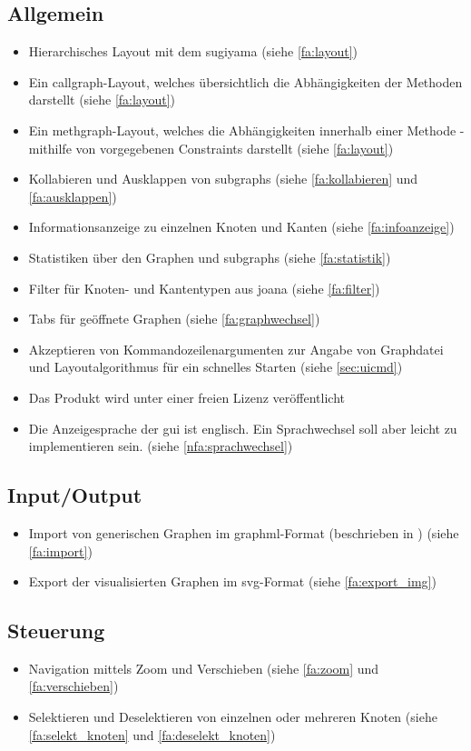 \subsection{Allgemein}
  \begin{itemize}
    \item Hierarchisches Layout mit dem \gls{sugiyama} (siehe \ref{fa:layout})
    \item Ein \gls{callgraph}-Layout, welches übersichtlich die Abhängigkeiten der Methoden darstellt (siehe \ref{fa:layout})
    \item Ein \gls{methgraph}-Layout, welches die Abhängigkeiten innerhalb einer Methode - mithilfe von vorgegebenen Constraints darstellt (siehe \ref{fa:layout})
    \item Kollabieren und Ausklappen von \glspl{subgraph} (siehe \ref{fa:kollabieren} und \ref{fa:ausklappen})
    \item Informationsanzeige zu einzelnen Knoten und Kanten (siehe \ref{fa:infoanzeige})
    \item Statistiken über den Graphen und \glspl{subgraph} (siehe \ref{fa:statistik})
    \item Filter für Knoten- und Kantentypen aus \gls{joana} (siehe \ref{fa:filter})
    \item Tabs für geöffnete Graphen (siehe \ref{fa:graphwechsel})
    \item Akzeptieren von Kommandozeilenargumenten zur Angabe von Graphdatei und Layoutalgorithmus für ein schnelles Starten (siehe \autoref{sec:uicmd})
    \item Das Produkt wird unter einer freien Lizenz veröffentlicht
    \item Die Anzeigesprache der \gls{gui} ist englisch. Ein Sprachwechsel soll aber leicht zu implementieren sein. (siehe \ref{nfa:sprachwechsel})
  \end{itemize}

\subsection{Input/Output}
  \begin{itemize}
    \item Import von generischen Graphen im \gls{graphml}-Format (beschrieben in ) (siehe \ref{fa:import})
    \item Export der visualisierten Graphen im \gls{svg}-Format (siehe \ref{fa:export_img})
  \end{itemize}

\subsection{Steuerung}
  \begin{itemize}
    \item Navigation mittels Zoom und Verschieben (siehe \ref{fa:zoom} und \ref{fa:verschieben})
    \item Selektieren und Deselektieren von einzelnen oder mehreren Knoten (siehe \ref{fa:selekt_knoten} und \ref{fa:deselekt_knoten})
  \end{itemize}

